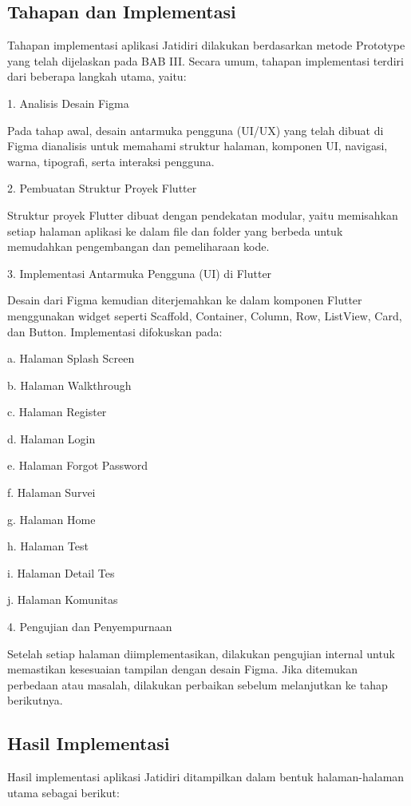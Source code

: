 \subsection{Tahapan dan Implementasi}

Tahapan implementasi aplikasi Jatidiri dilakukan berdasarkan metode Prototype yang telah dijelaskan pada BAB III. Secara umum, tahapan implementasi terdiri dari beberapa langkah utama, yaitu:

1. Analisis Desain Figma

Pada tahap awal, desain antarmuka pengguna (UI/UX) yang telah dibuat di Figma dianalisis untuk memahami struktur halaman, komponen UI, navigasi, warna, tipografi, serta interaksi pengguna.

2. Pembuatan Struktur Proyek Flutter

Struktur proyek Flutter dibuat dengan pendekatan modular, yaitu memisahkan setiap halaman aplikasi ke dalam file dan folder yang berbeda untuk memudahkan pengembangan dan pemeliharaan kode.

3. Implementasi Antarmuka Pengguna (UI) di Flutter

Desain dari Figma kemudian diterjemahkan ke dalam komponen Flutter menggunakan widget seperti Scaffold, Container, Column, Row, ListView, Card, dan Button. Implementasi difokuskan pada:

a. Halaman Splash Screen

b. Halaman Walkthrough

c. Halaman Register

d. Halaman Login

e. Halaman Forgot Password

f. Halaman Survei

g. Halaman Home

h. Halaman Test

i. Halaman Detail Tes

j. Halaman Komunitas

4. Pengujian dan Penyempurnaan

Setelah setiap halaman diimplementasikan, dilakukan pengujian internal untuk memastikan kesesuaian tampilan dengan desain Figma. Jika ditemukan perbedaan atau masalah, dilakukan perbaikan sebelum melanjutkan ke tahap berikutnya.


\subsection{Hasil Implementasi}

Hasil implementasi aplikasi Jatidiri ditampilkan dalam bentuk halaman-halaman utama sebagai berikut:

